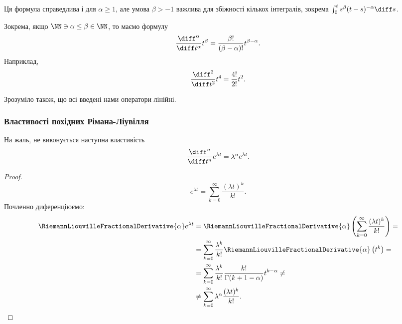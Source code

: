 \begin{remark}
    Ця формула справедлива і для $\alpha \ge 1$, але умова $\beta > -1$ важлива для збіжності кількох інтегралів, зокрема $\int_0^t s^\beta (t- s)^{-\alpha} \diff s$.
\end{remark}

\begin{example}
    Зокрема, якщо $\NN \ni \alpha \le \beta \in \NN$, то маємо формулу
    \begin{equation}
        \frac{\diff^\alpha}{\diff t^\alpha} t^\beta = \frac{\beta!}{(\beta - \alpha)!} t^{\beta - \alpha}.
    \end{equation}
    Наприклад,
    \begin{equation}
        \frac{\diff^2}{\diff t^2} t^4 = \frac{4!}{2!} t^2.
    \end{equation}
\end{example}

\begin{remark}
    Зрозуміло також, що всі введені нами оператори лінійні.
\end{remark}

\subsubsection{Властивості похідних Рімана-Ліувілля}

\begin{proposition}
    На жаль, не виконується наступна властивість
    \begin{equation}
        \frac{\diff^n}{\diff t^n} e^{\lambda t} = \lambda^n e^{\lambda t}.
    \end{equation}
\end{proposition}

\begin{proof}
    \begin{equation}
        e^{\lambda t} = \sum_{k = 0}^\infty \frac{(\lambda t)^k}{k!}.
    \end{equation}
    Почленно диференціюємо:
    \begin{equation}
        \begin{aligned} 
            \RiemannLiouvilleFractionalDerivative{\alpha} e^{\lambda t} 
            &= \RiemannLiouvilleFractionalDerivative{\alpha} \left( \sum_{k = 0}^\infty \frac{(\lambda t)^k}{k!} \right) = \\
            &= \sum_{k = 0}^\infty \frac{\lambda^k}{k!} \RiemannLiouvilleFractionalDerivative{\alpha} \left( t^k \right) = \\
            &= \sum_{k = 0}^\infty \frac{\lambda^k}{k!} \frac{k!}{\Gamma(k + 1 - \alpha)} t^{k - \alpha} \ne \\
            &\ne \sum_{k = 0}^\infty \lambda^\alpha \frac{(\lambda t)^k}{k!}.
        \end{aligned}
    \end{equation}
\end{proof}

